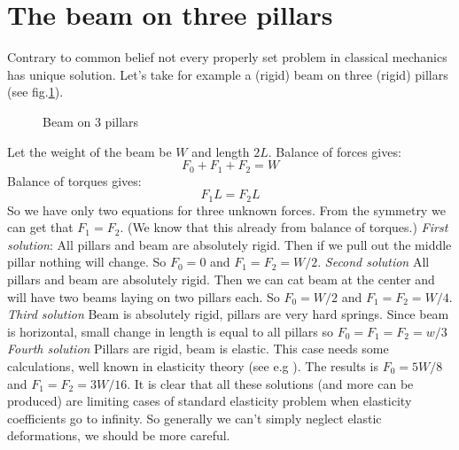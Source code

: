 \section{ The beam on three pillars}
\label{limits:beam}
Contrary to common belief not every properly set problem in
classical mechanics has unique solution. Let's take for example
a (rigid) beam on three (rigid) pillars (see fig.\ref{beam3}).
\begin{figure}[h]
\caption{Beam on 3 pillars}
\label {beam3}
\end{figure}
Let the weight of the beam be $W$ and length $2 L$.
Balance of forces gives:
\begin{equation}
        F_0+F_1+F_2=W \label {bf}
\end{equation}
Balance of torques gives:
\begin{equation}
        F_1 L=F_2 L \label {bt}
\end{equation}
   So we have only two equations for three
unknown forces. From the symmetry we can get that $F_1=F_2$. 
(We know that this already from balance of torques.)
{\em First solution}:
All pillars and beam are absolutely rigid. Then
if we pull out the middle pillar nothing will change.
So $F_0=0$ and $F_1=F_2=W/2$.
{\em Second solution}
All pillars and beam are absolutely rigid. Then
we can cat beam at the center and will have two
beams laying on two pillars each.
So $F_0=W/2$ and $F_1=F_2=W/4$.
{\em Third solution}
Beam is absolutely rigid, pillars are very hard springs.
Since beam is horizontal, small change in length is 
equal to all pillars so $F_0=F_1=F_2=w/3$
{\em Fourth solution}
Pillars are rigid, beam is elastic. This case needs
some calculations, well known in elasticity theory
(see e.g \cite {Landau-Lifshitz-7}).
The results is $F_0=5 W/8$ and $F_1=F_2=3 W/16$.
It is clear that all these solutions (and more can be
produced) are limiting cases of standard elasticity 
problem when elasticity coefficients go to infinity.
So generally we can't simply neglect elastic deformations,
we should be more careful.

